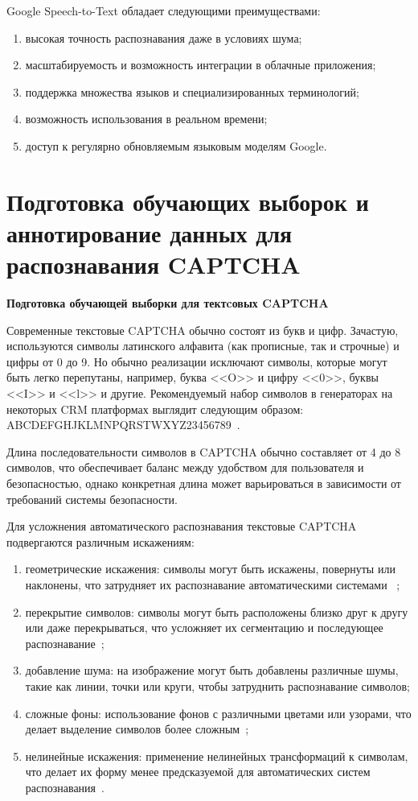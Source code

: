 Google Speech-to-Text обладает следующими преимуществами:

\begin{enumerate}
    \item высокая точность распознавания даже в условиях шума;
    \item масштабируемость и возможность интеграции в облачные приложения;
    \item поддержка множества языков и специализированных терминологий;
    \item возможность использования в реальном времени;
    \item доступ к регулярно обновляемым языковым моделям Google.
\end{enumerate}

\section{Подготовка обучающих выборок и аннотирование данных для распознавания CAPTCHA}

\textbf{Подготовка обучающей выборки для тектcовых CAPTCHA}

Современные текстовые CAPTCHA обычно состоят из букв и цифр. Зачастую, 
используются символы латинского алфавита (как прописные, так и строчные) и цифры 
от 0 до 9. Но обычно реализации исключают символы, которые могут быть легко 
перепутаны, например, буква <<O>> и цифру <<0>>, буквы <<I>> и <<l>> и другие. 
Рекомендуемый набор символов в генераторах на некоторых CRM платформах выглядит 
следующим образом: ABCDEFGHJKLMNPQRSTWXYZ23456789~\cite{Bitrix}.

Длина последовательности символов в CAPTCHA обычно составляет от 4 до 8 символов, 
что обеспечивает баланс между удобством для пользователя и безопасностью, однако 
конкретная длина может варьироваться в зависимости от требований системы 
безопасности.

Для усложнения автоматического распознавания текстовые CAPTCHA подвергаются 
различным искажениям:

\begin{enumerate}
    \item геометрические искажения: символы могут быть искажены, повернуты или 
    наклонены, что затрудняет их распознавание автоматическими системами~
    \cite{BrightData};
    \item перекрытие символов: символы могут быть расположены близко друг к 
    другу или даже перекрываться, что усложняет их сегментацию и последующее 
    распознавание~\cite{Proglib};
    \item добавление шума: на изображение могут быть добавлены различные шумы, 
    такие как линии, точки или круги, чтобы затруднить распознавание символов;
    \item сложные фоны: использование фонов с различными цветами или узорами, 
    что делает выделение символов более сложным~\cite{NVJournal};
    \item нелинейные искажения: применение нелинейных трансформаций к символам, 
    что делает их форму менее предсказуемой для автоматических систем 
    распознавания~\cite{Simai}.
\end{enumerate}

